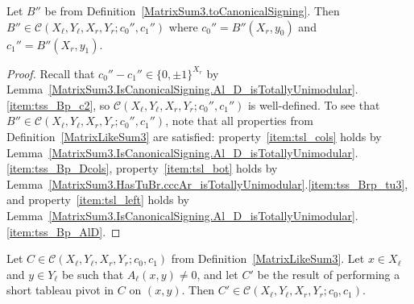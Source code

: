 \begin{lemma}
    \label{MatrixSum3.IsCanonicalSigning.toMatrixLikeSum3}
    \leanok
    Let $B''$ be from Definition~\ref{MatrixSum3.toCanonicalSigning}. Then $B'' \in \mathcal{C} (X_{\ell}, Y_{\ell}, X_{r}, Y_{r}; c_{0}'', c_{1}'')$ where $c_{0}'' = B'' (X_{r}, y_{0})$ and $c_{1}'' = B'' (X_{r}, y_{1})$.
\end{lemma}

\begin{proof}
    \leanok
    Recall that $c_{0}'' - c_{1}'' \in \{0, \pm 1\}^{X_{r}}$ by Lemma~\ref{MatrixSum3.IsCanonicalSigning.Al_D_isTotallyUnimodular}.\ref{item:tss_Bp_c2}, so $\mathcal{C} (X_{\ell}, Y_{\ell}, X_{r}, Y_{r}; c_{0}'', c_{1}'')$ is well-defined. To see that $B'' \in \mathcal{C} (X_{\ell}, Y_{\ell}, X_{r}, Y_{r}; c_{0}'', c_{1}'')$, note that all properties from Definition~\ref{MatrixLikeSum3} are satisfied: property~\ref{item:tsl_cols} holds by Lemma~\ref{MatrixSum3.IsCanonicalSigning.Al_D_isTotallyUnimodular}.\ref{item:tss_Bp_Dcols}, property~\ref{item:tsl_bot} holds by Lemma~\ref{MatrixSum3.HasTuBr.cccAr_isTotallyUnimodular}.\ref{item:tss_Brp_tu3}, and property~\ref{item:tsl_left} holds by Lemma~\ref{MatrixSum3.IsCanonicalSigning.Al_D_isTotallyUnimodular}.\ref{item:tss_Bp_AlD}.
\end{proof}

\begin{lemma}
    \label{MatrixLikeSum3.shortTableauPivot}
    \leanok
    Let $C \in \mathcal{C} (X_{\ell}, Y_{\ell}, X_{r}, Y_{r}; c_{0}, c_{1})$ from Definition~\ref{MatrixLikeSum3}. Let $x \in X_{\ell}$ and $y \in Y_{\ell}$ be such that $A_{\ell} (x, y) \neq 0$, and let $C'$ be the result of performing a short tableau pivot in $C$ on $(x, y)$. Then $C' \in \mathcal{C} (X_{\ell}, Y_{\ell}, X_{r}, Y_{r}; c_{0}, c_{1})$.
\end{lemma}

